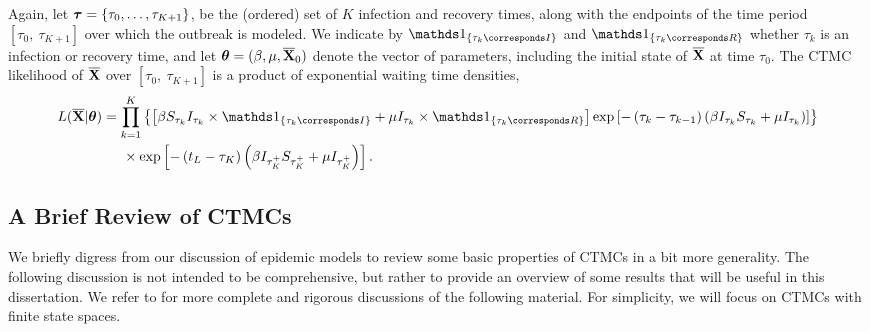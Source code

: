 Again, let $ \boldsymbol{\tau} = \lbrace\tau_0,\dots,\tau_{K+1}\rbrace $, be the (ordered) set of $ K $ infection and recovery times, along with the endpoints of the time period $ [\tau_0,\ \tau_{K+1}] $ over which the outbreak is modeled. We indicate by $ \ind{\tau_k \corresponds I} $ and $ \ind{\tau_k \corresponds R} $ whether $ \tau_k $ is an infection or recovery time, and let $ \boldsymbol{\theta} = (\beta, \mu, \overline{\mathbf{X}}_0) $ denote the vector of parameters, including the initial state of $ \overline{\mathbf{X}} $ at time $ \tau_0 $. The CTMC likelihood of $ \overline{\mathbf{X}} $ over $ [\tau_0,\ \tau_{K+1}] $ is a product of exponential waiting time densities,
\begin{align} 
\label{eqn:sir_pop_likelihood}
L(\overline{\bX}| \btheta) &= \prod_{k = 1}^{K}\left \lbrace \left [\beta S_{\tau_k} I_{\tau_k}\times\ind{\tau_k \corresponds I} + \mu I_{\tau_k}\times\ind{\tau_k \corresponds R}\right ] \exp{\left [-\left (\tau_k - \tau_{k-1}\right )\left (\beta I_{\tau_k} S_{\tau_k} + \mu I_{\tau_k}\right )\right ]}\right \rbrace \nonumber \\
& \hspace{0.2in} \times \exp \left [-\left (t_L - \tau_K\right )\left (\beta I_{\tau_K^+}S_{\tau_K^+} + \mu I_{\tau_K^+}\right )\right ]. 
\end{align} 

\subsection{A Brief Review of CTMCs}
\label{subsec:ctmc_overview}

We briefly digress from our discussion of epidemic models to review some basic properties of CTMCs in a bit more generality. The following discussion is not intended to be comprehensive, but rather to provide an overview of some results that will be useful in this dissertation. We refer to \cite{bremaud1999markov,fuchs2013inference,guttorp1995stochastic,wilkinson2011stochastic} for more complete and rigorous discussions of the following material. For simplicity, we will focus on CTMCs with finite state spaces. 

